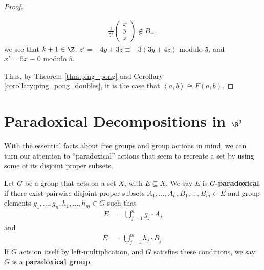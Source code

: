 \begin{proof}
\begin{enumerate}[(1)]
      \begin{align*}
        \frac{1}{5^{k}} \begin{pmatrix}x\\y\\z\end{pmatrix}\notin B_{+},
      \end{align*}
      we see that $k+1\in \Z$, $z' = -4y + 3z \equiv -3\left(3y + 4z\right)$ modulo $5$, and $x' = 5x \equiv 0$ modulo $5$.
  \end{enumerate}
  Thus, by Theorem \ref{thm:ping_pong} and Corollary \ref{corollary:ping_pong_doubles}, it is the case that $\left\langle a,b \right\rangle\cong F(a,b)$.
\end{proof}

\section{Paradoxical Decompositions in $\R^3$}%
With the essential facts about free groups and group actions in mind, we can turn our attention to ``paradoxical'' actions that seem to recreate a set by using some of its disjoint proper subsets.
\begin{definition}
  Let $G$ be a group that acts on a set $X$, with $E\subseteq X$. We say $E$ is $G$\textbf{-paradoxical} if there exist pairwise disjoint proper subsets $A_1,\dots,A_n,B_1,\dots,B_m \subset E$ and group elements $g_1,\dots,g_n,h_1,\dots,h_m\in G$ such that
  \begin{align*}
    E &= \bigcup_{j=1}^{n}g_j\cdot A_j
  \end{align*}
  and
  \begin{align*}
    E &= \bigcup_{j=1}^{m}h_j\cdot B_j.
  \end{align*}
  If $G$ acts on itself by left-multiplication, and $G$ satisfies these conditions, we say $G$ is a \textbf{paradoxical group}.
\end{definition}
